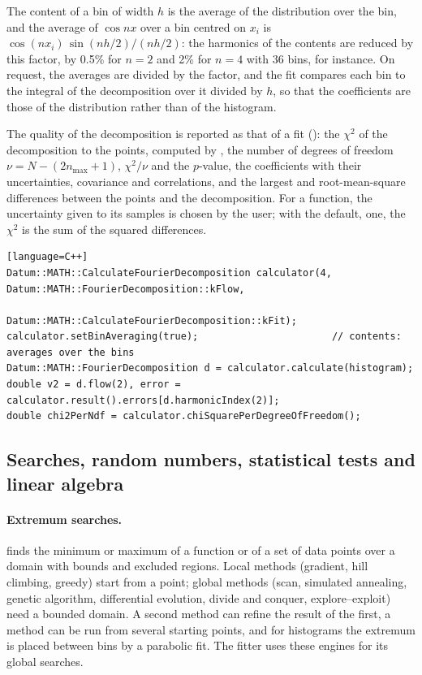The content of a bin of width $h$ is the average of the distribution over the bin, and the average of $\cos nx$ over
a bin centred on $x_i$ is $\cos(n x_i)\,\sin(nh/2)/(nh/2)$: the harmonics of the contents are reduced by this factor,
by 0.5\% for $n = 2$ and 2\% for $n = 4$ with 36 bins, for instance. On request, the averages are divided by the
factor, and the fit compares each bin to the integral of the decomposition over it divided by $h$, so that the
coefficients are those of the distribution rather than of the histogram.

The quality of the decomposition is reported as that of a fit (): the $\chi^2$ of the decomposition
to the points, computed by , the number of degrees of freedom $\nu = N - (2n_{\max} + 1)$,
$\chi^2/\nu$ and the $p$-value, the coefficients with their uncertainties, covariance and correlations, and the
largest and root-mean-square differences between the points and the decomposition. For a function, the uncertainty
given to its samples is chosen by the user; with the default, one, the $\chi^2$ is the sum of the squared
differences.
\begin{widetext}
\begin{verbatim}[language=C++]
Datum::MATH::CalculateFourierDecomposition calculator(4, Datum::MATH::FourierDecomposition::kFlow,
                                                    Datum::MATH::CalculateFourierDecomposition::kFit);
calculator.setBinAveraging(true);                       // contents: averages over the bins
Datum::MATH::FourierDecomposition d = calculator.calculate(histogram);
double v2 = d.flow(2), error = calculator.result().errors[d.harmonicIndex(2)];
double chi2PerNdf = calculator.chiSquarePerDegreeOfFreedom();
\end{verbatim}
\end{widetext}

\subsection{Searches, random numbers, statistical tests and linear algebra}
\label{sec:mathother}

\paragraph{Extremum searches.}
 finds the minimum or maximum of a function or of a set of data points over a domain with
bounds and excluded regions. Local methods (gradient, hill climbing, greedy) start from a point; global methods (scan,
simulated annealing, genetic algorithm, differential evolution, divide and conquer, explore--exploit) need a bounded
domain. A second method can refine the result of the first, a method can be run from several starting points, and
for histograms the extremum is placed between bins by a parabolic fit. The fitter uses these engines for its global
searches.

